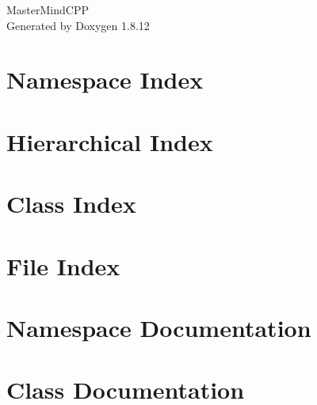 \documentclass[twoside]{book}
\newcommand{\+}{\discretionary{\mbox{\scriptsize$\hookleftarrow$}}{}{}}
\newcommand{\clearemptydoublepage}{%
  \newpage{\pagestyle{empty}\cleardoublepage}%
}
\begin{document}
\hypersetup{pageanchor=false,
             bookmarksnumbered=true,
             pdfencoding=unicode
            }
\begin{titlepage}
\vspace*{7cm}
\begin{center}%
{\Large Master\+Mind\+C\+PP }\\
\vspace*{1cm}
{\large Generated by Doxygen 1.8.12}\\
\end{center}
\end{titlepage}
\clearemptydoublepage
{}
\tableofcontents
\clearemptydoublepage
{}
\hypersetup{pageanchor=true}

\chapter{Namespace Index}

\chapter{Hierarchical Index}

\chapter{Class Index}

\chapter{File Index}

\chapter{Namespace Documentation}








\chapter{Class Documentation}














\end{document}
